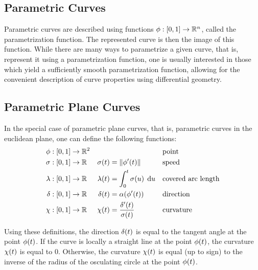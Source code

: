 \documentclass[a4paper]{article}
\begin{document}
		\subsection{Parametric Curves}
		\label{section:parametric_curves}

			Parametric curves are described using functions \(\phi : \left[ 0,1 \right] \rightarrow \mathbb{R}^{n}\), called the parametrization function. The represented curve is then the image of this function. While there are many ways to parametrize a given curve, that is, represent it using a parametrization function, one is usually interested in those which yield a sufficiently smooth parametrization function, allowing for the convenient description of curve properties using differential geometry.

		\subsection{Parametric Plane Curves}
		\label{section:parametric_plane_curves}

			In the special case of parametric plane curves, that is, parametric curves in the euclidean plane, one can define the following functions:
			\begin{align*}
				\phi    & : \function{\unit}{\R{2}} &                    &                                                && \text{point}\\
				\sigma  & : \function{\unit}{\RR}   & \apply{\sigma}{t}  & = \xn{\apply{\phi'}{t}}                        && \text{speed}\\
				\lambda & : \function{\unit}{\RR}   & \apply{\lambda}{t} & = \integral{0}{t}{\apply{\sigma}{u}}{u}        && \text{covered arc length}\\
				\delta  & : \function{\unit}{\RR}   & \apply{\delta}{t}  & = \apply{\alpha}{\apply{\phi'}{t}}             && \text{direction}\\
				\chi    & : \function{\unit}{\RR}   & \apply{\chi}{t}    & = \frac{\apply{\delta'}{t}}{\apply{\sigma}{t}} && \text{curvature}
			\end{align*}

			Using these definitions, the direction \(\delta\!\left( t \right)\) is equal to the tangent angle at the point \(\phi\!\left( t \right)\). If the curve is locally a straight line at the point \(\phi\!\left( t \right)\), the curvature \(\chi\!\left( t \right)\) is equal to \(0\). Otherwise, the curvature \(\chi\!\left( t \right)\) is equal (up to sign) to the inverse of the radius of the osculating circle at the point \(\phi\!\left( t \right)\).
\end{document}
